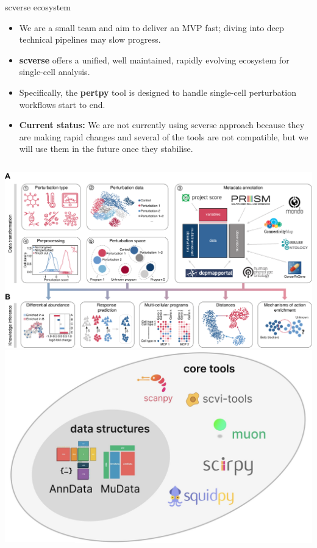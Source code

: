 \documentclass[handout]{beamer}
\begin{document}
\begin{frame}{scverse ecosystem}
    \begin{itemize}
        \item We are a small team and aim to deliver an MVP fast; diving into deep technical pipelines may slow progress.
        \item \textbf{scverse} offers a unified, well maintained, rapidly evolving ecosystem for single-cell analysis.
        \item Specifically, the \textbf{pertpy} tool is designed to handle single-cell perturbation workflows start to end.
        \item \textbf{Current status:} We are not currently using scverse approach because they are making rapid changes and several of the tools are not compatible, but we will use them in the future once they stabilise.
    \end{itemize}
    \vspace{1em}
    \begin{columns}
        \centering
        \includegraphics[width=0.8\linewidth]{pertpy.png}
        \centering
        \includegraphics[width=0.8\linewidth]{scverse.jpg}
    \end{columns}
\end{frame}
\end{document}
